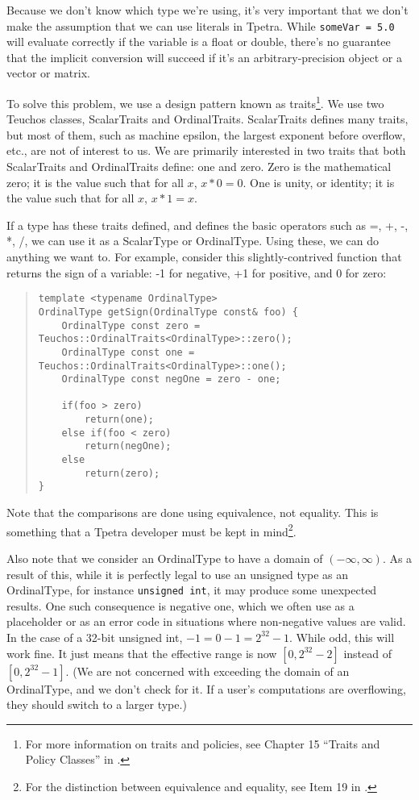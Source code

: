 \documentclass[10pt,relax]{TpetraDesign}
\begin{document}
Because we don't know which type we're using, it's very important that we don't make the assumption that we can use literals in Tpetra. While \texttt{someVar = 5.0} will evaluate correctly if the variable is a float or double, there's no guarantee that the implicit conversion will succeed if it's an arbitrary-precision object or a vector or matrix.

To solve this problem, we use a design pattern known as traits\footnote{For more information on traits and policies, see Chapter 15 ``Traits and Policy Classes'' in \cite{Templates-Complete-Guide}.}. We use two Teuchos classes, ScalarTraits and OrdinalTraits. ScalarTraits defines many traits, but most of them, such as machine epsilon, the largest exponent before overflow, etc., are not of interest to us. We are primarily interested in two traits that both ScalarTraits and OrdinalTraits define: one and zero. Zero is the mathematical zero; it is the value such that for all $x$, $x * 0 = 0$. One is unity, or identity; it is the value such that for all $x$, $x * 1 = x$.


If a type has these traits defined, and defines the basic operators such as =, +, -, *, /, we can use it as a ScalarType or OrdinalType. Using these, we can do anything we want to. For example, consider this slightly-contrived function that returns the sign of a variable: -1 for negative, +1 for positive, and 0 for zero:
\begin{quote}
\begin{verbatim}
template <typename OrdinalType>
OrdinalType getSign(OrdinalType const& foo) {
    OrdinalType const zero = Teuchos::OrdinalTraits<OrdinalType>::zero();
    OrdinalType const one = Teuchos::OrdinalTraits<OrdinalType>::one();
    OrdinalType const negOne = zero - one;
    
    if(foo > zero)
        return(one);
    else if(foo < zero)
        return(negOne);
    else
        return(zero);
}
\end{verbatim}
\end{quote}
Note that the comparisons are done using equivalence, not equality. This is something that a Tpetra developer must be kept in mind\footnote{For the distinction between equivalence and equality, see Item 19 in \cite{Effective-STL}.}. 

Also note that we consider an OrdinalType to have a domain of $\left( -\infty, \infty \right)$. As a result of this, while it is perfectly legal to use an unsigned type as an OrdinalType, for instance \texttt{unsigned int}, it may produce some unexpected results. One such consequence is negative one, which we often use as a placeholder or as an error code in situations where non-negative values are valid. In the case of a 32-bit unsigned int, $-1 = 0 - 1 = 2^{32} - 1$. While odd, this will work fine. It just means that the effective range is now $\left[ 0, 2^{32} - 2 \right]$ instead of $\left[ 0, 2^{32} - 1 \right]$. (We are not concerned with exceeding the domain of an OrdinalType, and we don't check for it. If a user's computations are overflowing, they should switch to a larger type.)
\end{document}
